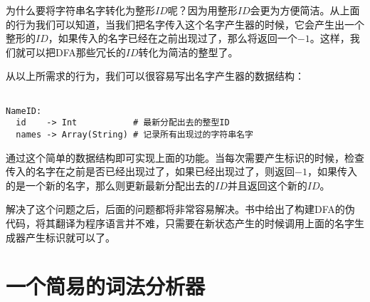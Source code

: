 为什么要将字符串名字转化为整形$ID$呢？因为用整形$ID$会更为方便简洁。从上面的行为我们可以知道，当我们把名字传入这个名字产生器的时候，它会产生出一个整形的$ID$，如果传入的名字已经在之前出现过了，那么将返回一个$-1$。这样，我们就可以把DFA那些冗长的$ID$转化为简洁的整型了。

从以上所需求的行为，我们可以很容易写出名字产生器的数据结构：

\begin{verbatim}

NameID:
  id    -> Int           # 最新分配出去的整型ID
  names -> Array(String) # 记录所有出现过的字符串名字

\end{verbatim}
                  
通过这个简单的数据结构即可实现上面的功能。当每次需要产生标识的时候，检查传入的名字在之前是否已经出现过了，如果已经出现过了，则返回$-1$，如果传入的是一个新的名字，那么则更新最新分配出去的$ID$并且返回这个新的$ID$。

解决了这个问题之后，后面的问题都将非常容易解决。书中给出了构建DFA的伪代码，将其翻译为程序语言并不难，只需要在新状态产生的时候调用上面的名字生成器产生标识就可以了。

\section{一个简易的词法分析器}

